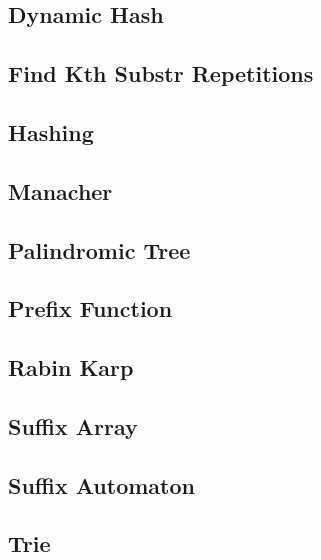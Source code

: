 \documentclass[10pt,landscape,twocolumn,a4paper,notitlepage]{article}
\newcommand\cppfile[2][]{

}
\begin{document}
\subsection{Dynamic Hash}
\cppfile{strings/dynamic_Hash.cpp}

\subsection{Find Kth Substr Repetitions}
\cppfile{strings/find_kth_substr_repetitions.cpp}

\subsection{Hashing}
\cppfile{strings/hashing.cpp}

\subsection{Manacher}
\cppfile{strings/manacher.cpp}

\subsection{Palindromic Tree}
\cppfile{strings/palindromic_tree.cpp}

\subsection{Prefix Function}
\cppfile{strings/prefix_function.cpp}

\subsection{Rabin Karp}
\cppfile{strings/rabin_karp.cpp}

\subsection{Suffix Array}
\cppfile{strings/suffix_array.cpp}

\subsection{Suffix Automaton}
\cppfile{strings/suffix_automaton.cpp}

\subsection{Trie}
\cppfile{strings/trie.cpp}
\end{document}
